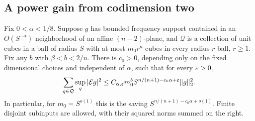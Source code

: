 \subsection{A power gain from codimension two}

\begin{proposition}
\label{d:strip}
Fix $0<\alpha<1/8$.  Suppose $g$ has bounded frequency support contained
in an $O(S^{-\alpha})$ neighborhood of an affine $(n-2)$-plane, and
$\mathcal Q$ is a collection of unit cubes in a ball of radius $S$ with
at most $m_0r^n$ cubes in every radius-$r$ ball, $r\ge1$.
Fix any $b$ with $\beta<b<2/n$.
There is $c_0>0$, depending only on the fixed dimensional choices and
independent of $\alpha$, such that for every $\varepsilon>0$,
\begin{equation}
 \sum_{q\in\mathcal Q}\sup_q|\mathcal E g|^2
 \le C_{\alpha,\varepsilon}m_0^b
           S^{n/(n+1)-c_0\alpha+\varepsilon}\lVert g\rVert_2^2.
 \label{d:strip-saving}
\end{equation}
In particular, for $m_0=S^{o(1)}$ this is the saving
$S^{n/(n+1)-c_0\alpha+o(1)}$.  Finite disjoint subinputs are allowed,
with their squared norms summed on the right.
\end{proposition}

